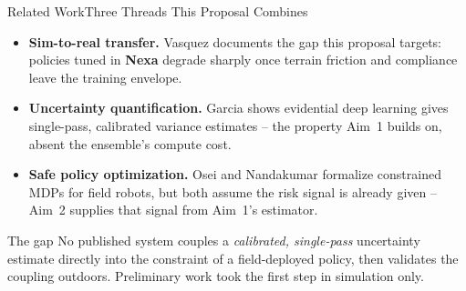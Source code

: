 \begin{frame}{Related Work}{Three Threads This Proposal Combines}
  \begin{itemize}[leftmargin=1.4em]
    \item[\faBook] \textbf{Sim-to-real transfer.} Vasquez
      \cite{vasquez2021fieldrobots} documents the gap this proposal targets:
      policies tuned in \textbf{Nexa} degrade sharply once terrain friction
      and compliance leave the training envelope.
    \item[\faBook] \textbf{Uncertainty quantification.} Garcia
      \cite{garcia2024evidential} shows evidential deep learning gives
      single-pass, calibrated variance estimates -- the property Aim~1
      builds on, absent the ensemble's compute cost.
    \item[\faBook] \textbf{Safe policy optimization.} Osei
      \cite{osei2023constrained} and Nandakumar
      \cite{nandakumar2022saferl} formalize constrained MDPs for field
      robots, but both assume the risk signal is already given -- Aim~2
      supplies that signal from Aim~1's estimator.
  \end{itemize}
  \par\vspace{6pt}
  \begin{alertblock}{The gap}
    No published system couples a \emph{calibrated, single-pass} uncertainty
    estimate directly into the constraint of a field-deployed policy, then
    validates the coupling outdoors. Preliminary work
    \cite{chen2025uncertainty} took the first step in simulation only.
  \end{alertblock}
\end{frame}
